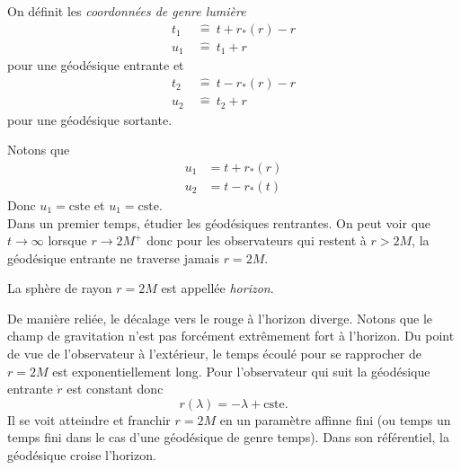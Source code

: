 \documentclass[a4paper,11pt]{report}
\begin{document}
            \begin{definition}
                On définit les \textit{coordonnées de genre lumière}
                \begin{align}
                    t_1 ~&\hat{=}~ t+r_*(r)-r\\
                    u_1 ~&\hat{=}~ t_1+r
                \end{align}
                pour une géodésique entrante et
                \begin{align}
                    t_2 ~&\hat{=}~ t-r_*(r)-r\\
                    u_2 ~&\hat{=}~ t_2+r
                \end{align}
                pour une géodésique sortante.
            \end{definition}
            Notons que 
            \begin{align}
                u_1 &= t+r_*(r)\\
                u_2 &= t-r_*(t)
            \end{align}
            Donc $u_1=\text{cste}$ et $u_1=\text{cste}$.\\
            

            
            Dans un premier temps, étudier les géodésiques rentrantes. On peut voir que $t\to\infty$ lorsque $r\to 2M^+$ donc pour les observateurs qui restent à $r> 2M$, la géodésique entrante ne traverse jamais $r=2M$.
            
            \begin{definition}
                La sphère de rayon $r=2M$ est appellée \textit{horizon}.
            \end{definition}
            
            
            De manière reliée, le décalage vers le rouge à l'horizon diverge. Notons que le champ de gravitation n'est pas forcément extrêmement fort à l'horizon. Du point de vue de l'observateur à l'extérieur, le temps écoulé pour se rapprocher de $r=2M$ est exponentiellement long. Pour l'observateur qui suit la géodésique entrante $\dot{r}$ est constant donc
            \begin{equation}
                r(\lambda) = -\lambda+\text{cste}.
            \end{equation}
            Il se voit atteindre et franchir $r=2M$ en un paramètre affinne fini (ou temps un temps fini dans le cas d'une géodésique de genre temps). Dans son référentiel, la géodésique croise l'horizon.\\
            
\end{document}
